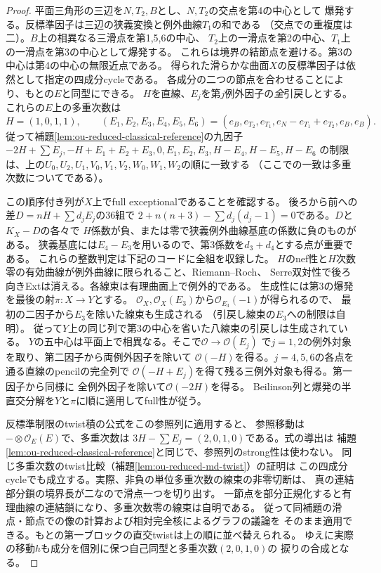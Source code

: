 \begin{proof}
平面三角形の三辺を$N,T_2,B$とし、$N,T_2$の交点を第4の中心として
爆発する。反標準因子は三辺の狭義変換と例外曲線$T_1$の和である
（交点での重複度は二）。$B$上の相異なる三滑点を第1,5,6の中心、
$T_2$上の一滑点を第2の中心、$T_1$上の一滑点を第3の中心として爆発する。
これらは境界の結節点を避ける。第3の中心は第4の中心の無限近点である。
得られた滑らかな曲面$X$の反標準因子は依然として指定の四成分cycleである。
各成分の二つの節点を合わせることにより、もとの$E$と同型にできる。
$H$を直線、$E_j$を第$j$例外因子の\emph{全}引戻しとする。
これらの$E$上の多重次数は
\[
 H=(1,0,1,1),\qquad (E_1,E_2,E_3,E_4,E_5,E_6)
 =(e_B,e_{T_2},e_{T_1},e_N-e_{T_1}+e_{T_2},e_B,e_B).
\]
従って補題\ref{lem:ou-reduced-classical-reference}の九因子
$-2H+\sum E_j,-H+E_1+E_2+E_3,0,E_1,E_2,E_3,H-E_4,H-E_5,H-E_6$
の制限は、上の$U_0,U_2,U_1,V_0,V_1,V_2,W_0,W_1,W_2$の順に一致する
（ここでの一致は多重次数についてである）。

この順序付き列が$X$上でfull exceptionalであることを確認する。
後ろから前への差$D=nH+\sum d_jE_j$の36組で
$2+n(n+3)-\sum d_j(d_j-1)=0$である。$D$と$K_X-D$の各々で
$H$係数が負、または零で狭義例外曲線基底の係数に負のものがある。
狭義基底には$E_4-E_3$を用いるので、第3係数を$d_3+d_4$とする点が重要である。
これらの整数判定は下記のコードに全組を収録した。
$H$のnef性と$H$次数零の有効曲線が例外曲線に限られること、Riemann--Roch、
Serre双対性で後ろ向きExtは消える。各線束は有理曲面上で例外的である。
生成性には第3の爆発を最後の射$\pi:X\to Y$とする。
$\mathcal O_X,\mathcal O_X(E_3)$から$\mathcal O_{E_3}(-1)$が得られるので、
最初の二因子から$E_3$を除いた線束も生成される
（引戻し線束の$E_3$への制限は自明）。
従って$Y$上の同じ列で第3の中心を省いた八線束の引戻しは生成されている。
$Y$の五中心は平面上で相異なる。そこで$\mathcal O\to\mathcal O(E_j)$
で$j=1,2$の例外対象を取り、第二因子から両例外因子を除いて
$\mathcal O(-H)$を得る。$j=4,5,6$の各点を通る直線のpencilの完全列で
$\mathcal O(-H+E_j)$を得て残る三例外対象も得る。第一因子から同様に
全例外因子を除いて$\mathcal O(-2H)$を得る。
Beilinson列と爆発の半直交分解を$Y$と$\pi$に順に適用してfull性が従う。

反標準制限のtwist積の公式をこの参照列に適用すると、
参照移動は$-\otimes\mathcal O_E(E)$で、多重次数は
$3H-\sum E_j=(2,0,1,0)$である。式の導出は
補題\ref{lem:ou-reduced-classical-reference}と同じで、参照列のstrong性は使わない。
同じ多重次数のtwist比較（補題\ref{lem:ou-reduced-md-twist}）の証明は
この四成分cycleでも成立する。実際、非負の単位多重次数の線束の非零切断は、
真の連結部分鎖の境界長が二なので滑点一つを切り出す。
一節点を部分正規化すると有理曲線の連結鎖になり、多重次数零の線束は自明である。
従って同補題の滑点・節点での像の計算および相対完全核によるグラフの議論を
そのまま適用できる。もとの第一ブロックの直交twistは上の順に並べ替えられる。
ゆえに実際の移動$h$も成分を個別に保つ自己同型と多重次数$(2,0,1,0)$の
捩りの合成となる。


\end{proof}

